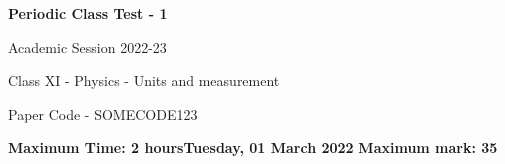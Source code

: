 \documentclass[10pt, a4paper, twoside]{exam}
\begin{document}
\selectfont
\noindent \huge \textbf{Periodic Class Test - 1}

\vspace{0.03in}
\noindent \normalsize Academic Session 2022-23

\vspace{0.03in}
\noindent Class XI - Physics - Units and measurement

\vspace{0.03in}
\noindent Paper Code - SOMECODE123




\par
\vspace{0.1in}
\noindent
\textbf{\normalsize Maximum Time: 2 hours}\hfill \normalsize \textbf{Tuesday, 01 March 2022} 	\hfill \normalsize \textbf{Maximum mark: 35}
\vspace{0.05in}
\hline{\noalign \hfill}

\noindent
\end{document}
